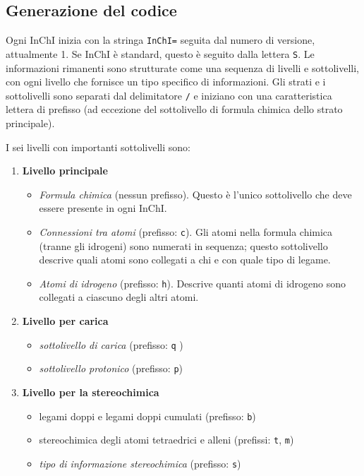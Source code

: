 \subsection{Generazione del codice}
Ogni InChI inizia con la stringa \verb|InChI=| seguita dal numero di versione, attualmente 1. Se InChI è standard, questo è seguito dalla lettera \verb|S|. Le informazioni rimanenti sono strutturate come una sequenza di livelli e sottolivelli, con ogni livello che fornisce un tipo specifico di informazioni.
Gli strati e i sottolivelli sono separati dal delimitatore \verb|/| e iniziano con una caratteristica lettera di prefisso (ad eccezione del sottolivello di formula chimica dello strato principale).

I sei livelli con importanti sottolivelli sono:
\begin{enumerate}
	\item \textbf{Livello principale}
	      \begin{itemize}
		      \item \textit{Formula chimica} (nessun prefisso). Questo è l'unico sottolivello che deve essere presente in ogni InChI.
		      \item \textit{Connessioni tra atomi} (prefisso: \verb|c|). Gli atomi nella formula chimica (tranne gli idrogeni) sono numerati in sequenza; questo sottolivello descrive quali atomi sono collegati a chi e con quale tipo di legame.
		      \item  \textit{Atomi di idrogeno} (prefisso: \verb|h|). Descrive quanti atomi di idrogeno sono collegati a ciascuno degli altri atomi.
	      \end{itemize}
	\item \textbf{Livello per carica}
	      \begin{itemize}
		      \item \textit{sottolivello di carica} (prefisso: \verb|q| )
		      \item \textit{sottolivello protonico} (prefisso: \verb|p|)
	      \end{itemize}
	\item \textbf{Livello per la stereochimica}
	      \begin{itemize}
		      \item legami doppi e legami doppi cumulati (prefisso: \verb|b|)
		      \item stereochimica degli atomi tetraedrici e alleni (prefissi: \verb|t|, \verb|m|)
		      \item \textit{tipo di informazione stereochimica} (prefisso: \verb|s|)

\end{itemize}
\end{enumerate}
